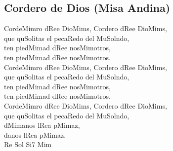 \subsection{Cordero de Dios (Misa Andina)}

\begin{center}

{\Large
Corde\ac{Mim}ro d\ac{Re}e Dio\ac{Mim}s, Cordero d\ac{Re}e Dio\ac{Mim}s,\\
que qu\ac{Sol}itas el peca\ac{Re}do del Mu\ac{Sol}ndo,\\
ten pied\ac{Mim}ad d\ac{Re}e nos\ac{Mim}otros,\\
ten pied\ac{Mim}ad d\ac{Re}e nos\ac{Mim}otros.\\
\vspace{2em}
Corde\ac{Mim}ro d\ac{Re}e Dio\ac{Mim}s, Cordero d\ac{Re}e Dio\ac{Mim}s,\\
que qu\ac{Sol}itas el peca\ac{Re}do del Mu\ac{Sol}ndo,\\
ten pied\ac{Mim}ad d\ac{Re}e nos\ac{Mim}otros,\\
ten pied\ac{Mim}ad d\ac{Re}e nos\ac{Mim}otros.\\
\vspace{2em}
Corde\ac{Mim}ro d\ac{Re}e Dio\ac{Mim}s, Cordero d\ac{Re}e Dio\ac{Mim}s,\\
que qu\ac{Sol}itas el peca\ac{Re}do del Mu\ac{Sol}ndo,\\
d\ac{Mim}anos l\ac{Re}a p\ac{Mim}az,\\
danos l\ac{Re}a p\ac{Mim}az.\\
\hspace{-5em}\ac{Re Sol Si7 Mim}
}
\end{center}
